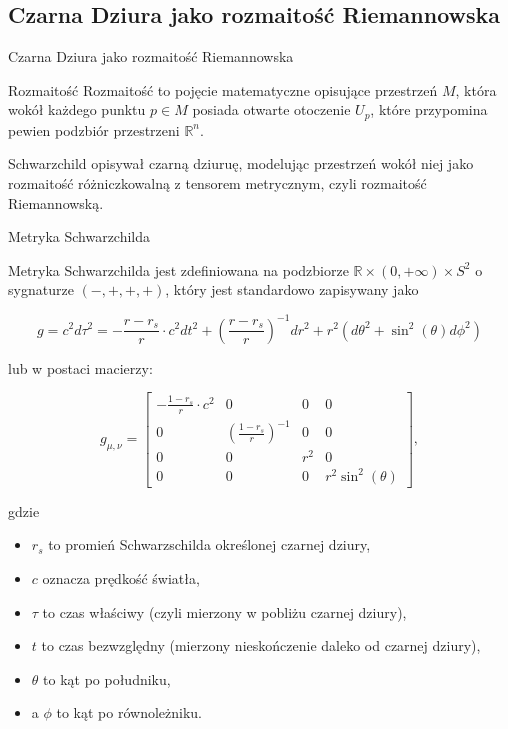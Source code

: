 \documentclass[polish, 9pt, xcolor=table, hyperref={pdfpagemode=FullScreen}]{beamer}
\newcommand{\R}{\mathbb{R}}
\begin{document}
\subsection{Czarna Dziura jako rozmaitość Riemannowska}

\begin{frame}{Czarna Dziura jako rozmaitość Riemannowska}

\begin{block}{Rozmaitość}
Rozmaitość to pojęcie matematyczne opisujące przestrzeń $M$, która wokół każdego punktu $p \in M$ posiada otwarte otoczenie $U_p$, które przypomina pewien podzbiór przestrzeni $\R^n$.
\end{block}

Schwarzchild opisywał czarną dziuruę, modelując przestrzeń wokół niej jako rozmaitość różniczkowalną z tensorem metrycznym, czyli rozmaitość Riemannowską.

\end{frame}

\begin{frame}{Metryka Schwarzchilda}

Metryka Schwarzchilda jest zdefiniowana na podzbiorze $\R \times (0, +\infty) \times S^2$ o sygnaturze $(-, +, +, +)$, który jest standardowo zapisywany jako

$$ g = c^2 d \tau^2 = -\frac{r - r_s}{r}\cdot c^2d t^2 + \left( \frac{r - r_s}{r}\right)^{-1} d r^2 + r^2(d \theta^2 + \sin^2(\theta) d \phi^2) $$

lub w postaci macierzy:

$$
g_{\mu, \nu} = \begin{bmatrix}
  -\frac{1 - r_s}{r}\cdot c^2 & 0                               & 0   & 0 \\
  0                 & \left(\frac{1 - r_s}{r}\right)^{-1} & 0   & 0 \\
  0                 & 0                                   & r^2 & 0 \\ 
  0                 & 0                                   & 0   & r^2 \sin^2(\theta)
\end{bmatrix}, 
$$

gdzie 
\begin{itemize}
  \item $r_s$ to promień Schwarzschilda określonej czarnej dziury, 
  \item $c$ oznacza prędkość światła, 
  \item $\tau$ to czas właściwy (czyli mierzony w pobliżu czarnej dziury), 
  \item $t$ to czas bezwzględny (mierzony nieskończenie daleko od czarnej dziury), 
  \item $\theta$ to kąt po południku, 
  \item a $\phi$ to kąt po równoleżniku.
\end{itemize}

\end{frame}
\end{document}
